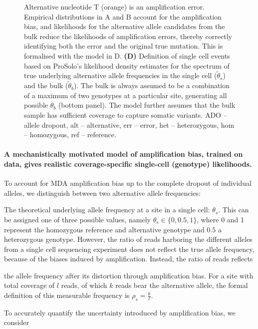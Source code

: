 \documentclass[12pt,inline]{wlscirep}
\begin{document}
\begin{figure}[!tpb]
{   Alternative nucleotide T (orange) is an amplification error.
   Empirical distributions in A and B account for the  amplification bias, and likelihoods for the alternative allele candidates from the bulk reduce the likelihoods of amplification errors, thereby correctly identifying both the error and the original true mutation.
   This is formalised with the model in D.
   \textbf{(D)} Definition of single cell events based on ProSolo's likelihood density estimates for the spectrum of true underlying alternative allele frequencies in the single cell ($\tilde{\theta}_s$) and the bulk ($\tilde{\theta}_b$).
   The bulk is always assumed to be a combination of a maximum of two genotypes at a particular site, generating all possible $\theta_b$ (bottom panel).
   The model further assumes that the bulk sample has sufficient coverage to capture somatic variants.\small\newline
   ADO -- allele dropout, alt -- alternative, err -- error, het -- heterozygous, hom -- homozygous, ref -- reference.}
  \label{fig:prosolo_alt-calling}
\end{figure}

\paragraph{A mechanistically motivated model of amplification bias, trained on data, gives realistic coverage-specific single-cell (genotype) likelihoods.}
To account for MDA amplification bias up to the complete dropout of individual alleles, we distinguish between two alternative allele frequencies:
\begin{enumerate*}[label={(\roman*)}]
  \item The theoretical underlying allele frequency at a site in a single cell: $\theta_s$.
   This can be assigned one of three possible values, namely $\theta_s\in\{0,0.5,1\}$, where 0 and 1 represent the homozygous reference and alternative genotype and $0.5$ a heterozygous genotype.
   However, the ratio of reads harboring the different alleles from a single cell sequencing experiment does not reflect the true allele frequency, because of the biases induced by amplification. 
  Instead, the ratio of reads reflects
  \item the allele frequency after its distortion through amplification bias.
   For a site with total coverage of $l$ reads, of which $k$ reads bear the alternative allele, the formal definition of this measurable frequency is $\rho_s=\frac{k}{l}$.
\end{enumerate*}
To accurately quantify the uncertainty introduced by amplification bias, we consider  
\end{document}
